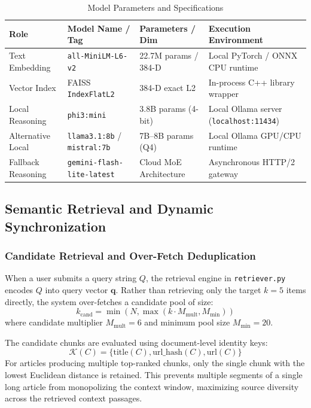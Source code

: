 \begin{table}[H]
\centering
\caption{Model Parameters and Specifications}
\label{tab:model_specs}
\small
\renewcommand{\arraystretch}{1.3}
\begin{tabularx}{\linewidth}{|l|l|l|X|}
\hline
\textbf{Role} & \textbf{Model Name / Tag} & \textbf{Parameters / Dim} & \textbf{Execution Environment} \\
\hline
Text Embedding & \texttt{all-MiniLM-L6-v2} & 22.7M params / 384-D & Local PyTorch / ONNX CPU runtime \\
\hline
Vector Index & FAISS \texttt{IndexFlatL2} & 384-D exact L2 & In-process C++ library wrapper \\
\hline
Local Reasoning & \texttt{phi3:mini} & 3.8B params (4-bit) & Local Ollama server (\texttt{localhost:11434}) \\
\hline
Alternative Local & \texttt{llama3.1:8b} / \texttt{mistral:7b} & 7B--8B params (Q4) & Local Ollama GPU/CPU runtime \\
\hline
Fallback Reasoning & \texttt{gemini-flash-lite-latest} & Cloud MoE Architecture & Asynchronous HTTP/2 gateway \\
\hline
\end{tabularx}
\end{table}

\subsection{Semantic Retrieval and Dynamic Synchronization}
\label{subsec:retrieval_sync}

\subsubsection{Candidate Retrieval and Over-Fetch Deduplication}
When a user submits a query string $Q$, the retrieval engine in \texttt{retriever.py} encodes $Q$ into query vector $\mathbf{q}$. Rather than retrieving only the target $k = 5$ items directly, the system over-fetches a candidate pool of size:
\begin{equation}
k_{\text{cand}} = \min(N, \max(k \cdot M_{\text{mult}}, M_{\text{min}}))
\end{equation}
where candidate multiplier $M_{\text{mult}} = 6$ and minimum pool size $M_{\text{min}} = 20$. 

The candidate chunks are evaluated using document-level identity keys:
\begin{equation}
\mathcal{K}(C) = \{ \text{title}(C), \text{url\_hash}(C), \text{url}(C) \}
\end{equation}
For articles producing multiple top-ranked chunks, only the single chunk with the lowest Euclidean distance is retained. This prevents multiple segments of a single long article from monopolizing the context window, maximizing source diversity across the retrieved context passages.

